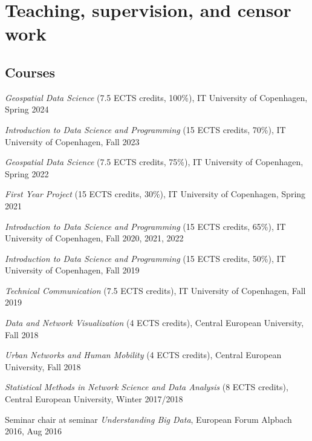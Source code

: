\documentclass[10pt,a4paper]{article}
\renewenvironment{itemize}{
  \begin{list}{}{
    \setlength{\leftmargin}{1.5em}
    \setlength{\itemsep}{0.25em}
    \setlength{\parskip}{0pt}
    \setlength{\parsep}{0.25em}
  }
}{
  \end{list}
}
\begin{document}
\section*{Teaching, supervision, and censor work}

\subsection*{Courses}
\begin{itemize} 
\item{\emph{Geospatial Data Science} (7.5 ECTS credits, 100\%), IT University of Copenhagen, Spring 2024}
\item{\emph{Introduction to Data Science and Programming} (15 ECTS credits, 70\%), IT University of Copenhagen, Fall 2023}
\item{\emph{Geospatial Data Science} (7.5 ECTS credits, 75\%), IT University of Copenhagen, Spring 2022}
\item{\emph{First Year Project} (15 ECTS credits, 30\%), IT University of Copenhagen, Spring 2021}
\item{\emph{Introduction to Data Science and Programming} (15 ECTS credits, 65\%), IT University of Copenhagen, Fall 2020, 2021, 2022}
\item{\emph{Introduction to Data Science and Programming} (15 ECTS credits, 50\%), IT University of Copenhagen, Fall 2019}
\item{\emph{Technical Communication} (7.5 ECTS credits), IT University of Copenhagen, Fall 2019}
\item{\emph{Data and Network Visualization} (4 ECTS credits), Central European University, Fall 2018}
\item{\emph{Urban Networks and Human Mobility} (4 ECTS credits), Central European University, Fall 2018}
\item{\emph{Statistical Methods in Network Science and Data Analysis} (8 ECTS credits), Central European University, Winter 2017/2018}
\item{Seminar chair at seminar \emph{Understanding Big Data}, European Forum Alpbach 2016, Aug 2016}
\end{itemize}
\end{document}
